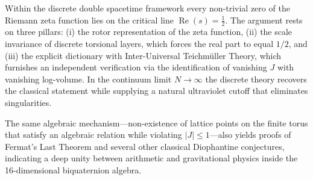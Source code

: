 \documentclass[dvipdfmx,11pt,a4paper]{article}
\begin{document}
Within the discrete double spacetime framework every non-trivial zero of the Riemann zeta function lies on the critical line \(\operatorname{Re}(s)=\frac12\). The argument rests on three pillars: (i) the rotor representation of the zeta function, (ii) the scale invariance of discrete torsional layers, which forces the real part to equal \(1/2\), and (iii) the explicit dictionary with Inter-Universal Teichmüller Theory, which furnishes an independent verification via the identification of vanishing \(J\) with vanishing log-volume. In the continuum limit \(N\to\infty\) the discrete theory recovers the classical statement while supplying a natural ultraviolet cutoff that eliminates singularities.

The same algebraic mechanism—non-existence of lattice points on the finite torus that satisfy an algebraic relation while violating \(|J|\le 1\)—also yields proofs of Fermat’s Last Theorem and several other classical Diophantine conjectures, indicating a deep unity between arithmetic and gravitational physics inside the 16-dimensional biquaternion algebra.
\end{document}
